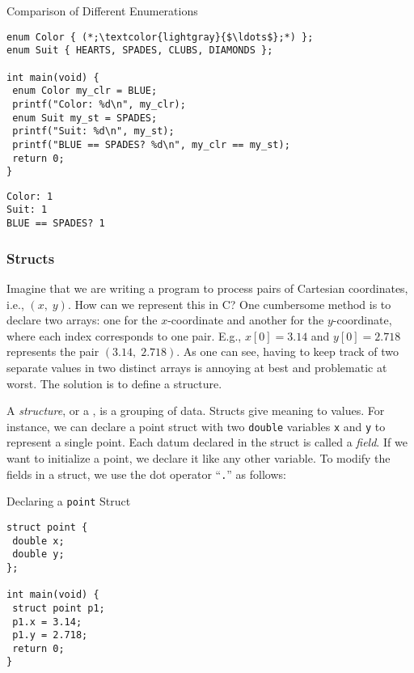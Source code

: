 \begin{clo}[main.c]{Comparison of Different Enumerations}\begin{lstlisting}[language=MyC]
enum Color { (*;\textcolor{lightgray}{$\ldots$};*) };
enum Suit { HEARTS, SPADES, CLUBS, DIAMONDS };

int main(void) {
 enum Color my_clr = BLUE;
 printf("Color: %d\n", my_clr);
 enum Suit my_st = SPADES;
 printf("Suit: %d\n", my_st);
 printf("BLUE == SPADES? %d\n", my_clr == my_st);
 return 0;
}
\end{lstlisting}
\tcblower
\begin{lstlisting}[language=MyOutput]
Color: 1
Suit: 1
BLUE == SPADES? 1
\end{lstlisting}
\end{clo}

\subsubsection*{Structs}

Imagine that we are writing a program to process pairs of Cartesian coordinates, i.e., $(x,\;y)$. How can we represent this in C? One cumbersome method is to declare two arrays: one for the $x$-coordinate and another for the $y$-coordinate, where each index corresponds to one pair. E.g., $x[0]=3.14$ and $y[0]=2.718$ represents the pair $(3.14,\;2.718)$. As one can see, having to keep track of two separate values in two distinct arrays is annoying at best and problematic at worst. The solution is to define a structure. 

A \textit{structure}, or a , is a grouping of data. Structs give meaning to values. For instance, we can declare a point struct with two \texttt{double} variables \texttt{x} and \texttt{y} to represent a single point. Each datum declared in the struct is called a \textit{field}. If we want to initialize a point, we declare it like any other variable. To modify the fields in a struct, we use the dot operator ``\texttt{.}'' as follows:
\begin{cl}[main.c]{Declaring a \texttt{point} Struct}
\begin{lstlisting}[language=MyC]
struct point {
 double x;
 double y;
};

int main(void) {
 struct point p1;
 p1.x = 3.14;
 p1.y = 2.718;
 return 0;
}
\end{lstlisting}
\end{cl}

